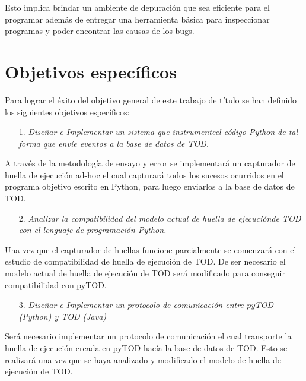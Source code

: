 \documentclass[12pt,legalpaper]{report}
\begin{document}
    Esto implica brindar un ambiente de depuración que sea eficiente para el programar además de entregar una herramienta básica para inspeccionar programas y poder encontrar las causas de los bugs.

	\section{Objetivos específicos}

Para lograr el éxito del objetivo general de este trabajo de título se han definido los siguientes objetivos específicos:

\begin{itemize}
\item[1.] \textit{Diseñar e Implementar un sistema que instrumente\footnotemark[1] el código Python de tal forma que envíe eventos a la base de datos de TOD.}
\end{itemize}

A través de la metodología de ensayo y error se implementará un capturador de huella de ejecución ad-hoc el cual capturará todos los sucesos ocurridos en el programa objetivo escrito en Python, para luego enviarlos a la base de datos de TOD.


\begin{itemize}
\item[2.] \textit{Analizar la compatibilidad del modelo actual de huella de ejecución\footnotemark[2] de TOD con el lenguaje de programación Python.}
\end{itemize}


Una vez que el capturador de huellas funcione parcialmente se comenzará con el estudio de compatibilidad de huella de ejecución de TOD.  De ser necesario el modelo actual de huella de ejecución de TOD será modificado para conseguir compatibilidad con pyTOD.

\begin{itemize}
\item[3.] \textit{Diseñar e Implementar un protocolo de comunicación entre pyTOD (Python) y TOD (Java)}
\end{itemize}

Será necesario implementar un protocolo de comunicación el cual transporte la huella de ejecución creada en pyTOD hacía la base de datos de TOD.  Esto se realizará una vez que se haya analizado y modificado el modelo de huella de ejecución de TOD.
\end{document}
